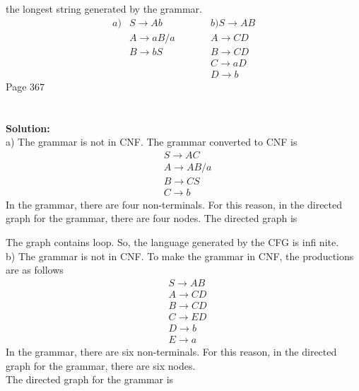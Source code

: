\documentclass[12pt,a4paper]{book}
\begin{document}
the longest string generated by the grammar.
\begin{align*}
a)&S \to Ab \quad\quad && b) S \to AB\\
&A \to aB/a \quad\quad   &&A \to CD\\
&B \to bS \quad\quad    &&B \to CD\\
& &&C \to aD\\
& &&D \to b
\end{align*}\newpage
 Page $367$\\\\\\
\textbf{Solution:} \\
a) The grammar is not in CNF. The grammar converted to CNF is
\begin{align*}
&S \to AC\\
&A \to AB/a\\
&B \to CS\\
&C \to b
\end{align*}
In the grammar, there are four non-terminals. For this reason, in the directed graph for the
grammar, there are four nodes. The directed graph is
\begin{center}
 \end{center}
The graph contains loop. So, the language generated by the CFG is infi nite.\\
b) The grammar is not in CNF. To make the grammar in CNF, the productions are as follows
\begin{align*}
&S \to AB\\
&A \to CD\\
&B \to CD\\
&C \to ED\\
&D \to b\\
&E \to a
\end{align*}
In the grammar, there are six non-terminals. For this reason, in the directed graph for the
grammar, there are six nodes.\\
The directed graph for the grammar is
\end{document}
